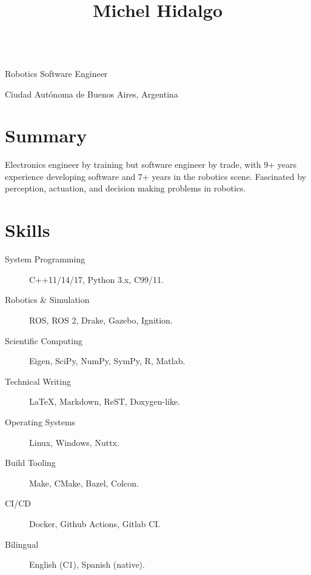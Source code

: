 \documentclass[english, letterpaper]{resume}
\begin{document}
\begin{center}
  \title{Michel Hidalgo} \\
  Robotics Software Engineer \\
  \address{Buenos Aires}{
    Ciudad Autónoma de Buenos Aires,
    Argentina} \\
  \begin{inlined}
    \item {}
    \item {}
    \item {}
  \end{inlined}
\end{center}

\section*{Summary}

Electronics engineer by training but software engineer by trade, with 9+ years experience developing software and 7+ years in the robotics scene. Fascinated by perception, actuation, and decision making problems in robotics.

\section*{Skills}

\hfill
\begin{minipage}{0.55\linewidth}
  \begin{description}
    \item[System Programming] C++11/14/17, Python 3.x, C99/11.
    \item[Robotics \& Simulation] ROS, ROS 2, Drake, Gazebo, Ignition.
    \item[Scientific Computing] Eigen, SciPy, NumPy, SymPy, R, Matlab.
    \item[Technical Writing] La\TeX, Markdown, ReST, Doxygen-like.
  \end{description}
\end{minipage}\hfill
\begin{minipage}{0.4\linewidth}
  \begin{description}
    \item[Operating Systems] Linux, Windows, Nuttx.
    \item[Build Tooling] Make, CMake, Bazel, Colcon.
    \item[CI/CD] Docker, Github Actions, Gitlab CI.\@
    \item[Bilingual] English (C1), Spanish (native).
  \end{description}
\end{minipage}
\hfill
\end{document}
